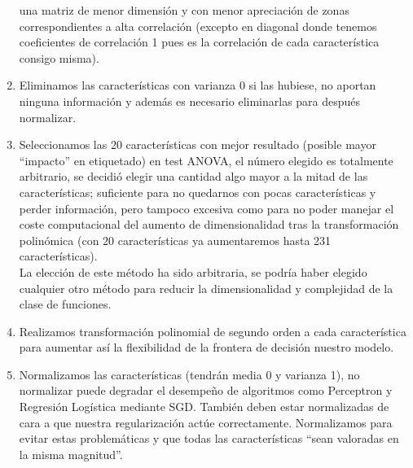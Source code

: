 \documentclass[11pt,a4paper]{article}
\theoremstyle{definition}
\begin{document}
\begin{enumerate}
\begin{figure}[H]
		\end{figure}
		una matriz de menor dimensión y con menor apreciación de zonas correspondientes a alta correlación (excepto en diagonal donde tenemos coeficientes de correlación 1 pues es la correlación de cada característica consigo misma).
		\item Eliminamos las características con varianza 0 si las hubiese, no aportan ninguna información y además es necesario eliminarlas para después normalizar.
		\item Seleccionamos las 20 características con mejor resultado (posible mayor ``impacto'' en etiquetado) en test ANOVA, el número elegido es totalmente arbitrario, se decidió elegir una cantidad algo mayor a la mitad de las características; suficiente para no quedarnos con pocas características y perder información, pero tampoco excesiva como para no poder manejar el coste computacional del aumento de dimensionalidad tras la transformación polinómica (con 20 características ya aumentaremos hasta 231 características).\\
		La elección de este método ha sido arbitraria, se podría haber elegido cualquier otro método para reducir la dimensionalidad y complejidad de la clase de funciones.
		\item Realizamos transformación polinomial de segundo orden a cada característica para aumentar así la flexibilidad de la frontera de decisión nuestro modelo.
		\item Normalizamos las características (tendrán media 0 y varianza 1), no normalizar puede degradar el desempeño de algoritmos como Perceptron y Regresión Logística mediante SGD. También deben estar normalizadas de cara a que nuestra regularización actúe correctamente. Normalizamos para evitar estas problemáticas y que todas las características ``sean valoradas en la misma magnitud''. %
	\end{enumerate}
\end{document}
